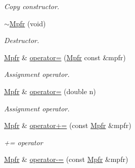 \begin{DoxyCompactItemize}
\begin{DoxyCompactList}\small\item\em Copy constructor. \end{DoxyCompactList}\item 
\hypertarget{class_mpfr_a84ac9326a9e9bdd001b91e2291b65cb1}{}\hyperlink{class_mpfr_a84ac9326a9e9bdd001b91e2291b65cb1}{$\sim$\+Mpfr} (void)\label{class_mpfr_a84ac9326a9e9bdd001b91e2291b65cb1}

\begin{DoxyCompactList}\small\item\em Destructor. \end{DoxyCompactList}\item 
\hypertarget{class_mpfr_a7cbcc476f4d9f2b8c376ec0c4e14f53c}{}\hyperlink{class_mpfr}{Mpfr} \& \hyperlink{class_mpfr_a7cbcc476f4d9f2b8c376ec0c4e14f53c}{operator=} (\hyperlink{class_mpfr}{Mpfr} const \&mpfr)\label{class_mpfr_a7cbcc476f4d9f2b8c376ec0c4e14f53c}

\begin{DoxyCompactList}\small\item\em Assignment operator. \end{DoxyCompactList}\item 
\hypertarget{class_mpfr_a4b99467e4566a31b1e98e41a8a44479d}{}\hyperlink{class_mpfr}{Mpfr} \& \hyperlink{class_mpfr_a4b99467e4566a31b1e98e41a8a44479d}{operator=} (double n)\label{class_mpfr_a4b99467e4566a31b1e98e41a8a44479d}

\begin{DoxyCompactList}\small\item\em Assignment operator. \end{DoxyCompactList}\item 
\hypertarget{class_mpfr_adf854c4af05f92f7268ae88247ef4d24}{}\hyperlink{class_mpfr}{Mpfr} \& \hyperlink{class_mpfr_adf854c4af05f92f7268ae88247ef4d24}{operator+=} (const \hyperlink{class_mpfr}{Mpfr} \&mpfr)\label{class_mpfr_adf854c4af05f92f7268ae88247ef4d24}

\begin{DoxyCompactList}\small\item\em += operator \end{DoxyCompactList}\item 
\hypertarget{class_mpfr_aa77bc812b83eb0672dddcf87fafaef34}{}\hyperlink{class_mpfr}{Mpfr} \& \hyperlink{class_mpfr_aa77bc812b83eb0672dddcf87fafaef34}{operator-\/=} (const \hyperlink{class_mpfr}{Mpfr} \&mpfr)\label{class_mpfr_aa77bc812b83eb0672dddcf87fafaef34}


\end{DoxyCompactItemize}
